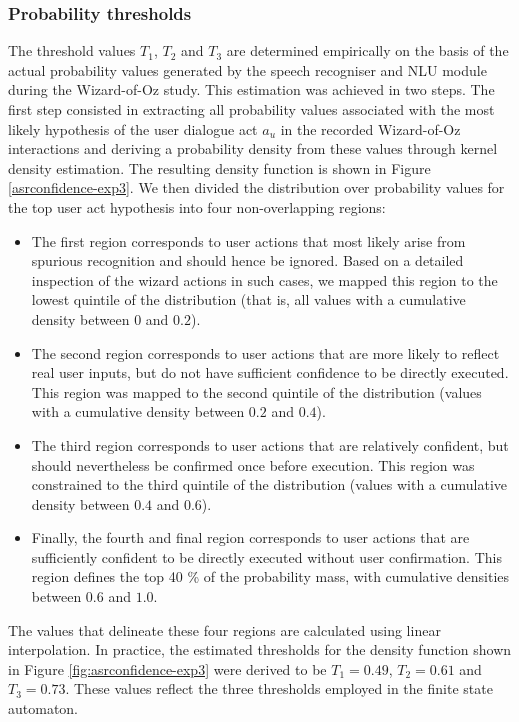 \subsubsection*{Probability thresholds}

The threshold values $T_1$, $T_2$ and $T_3$ are determined empirically on the basis of the actual probability values generated by the speech recogniser and NLU module during the Wizard-of-Oz study.  This estimation was achieved in two steps.  The first step consisted in  extracting all probability values associated with the most likely hypothesis of the user dialogue act $a_u$ in the recorded Wizard-of-Oz interactions and deriving a probability density from these values through kernel density estimation. The resulting density function is shown in Figure \ref{asrconfidence-exp3}. We then divided the distribution over probability values for the top user act hypothesis into four non-overlapping regions:
\begin{itemize}
\item The first region corresponds to user actions that most likely arise from spurious recognition and should hence be ignored. Based on a detailed inspection of the wizard actions in such cases, we mapped this region to the lowest quintile of the distribution (that is, all values with a cumulative density between $0$ and $0.2$). 
\item The second region corresponds to user actions that are more likely to reflect real user inputs, but do not have sufficient confidence to be directly executed.  This region was mapped to the second quintile of the distribution (values with a cumulative density between $0.2$ and $0.4$).
\item The third region corresponds to user actions that are relatively confident, but should nevertheless be confirmed once before execution.  This region was constrained to the third quintile of the distribution (values with a cumulative density between $0.4$ and $0.6$).
\item Finally, the fourth and final region corresponds to user actions that are sufficiently confident to be directly executed without user confirmation. This region defines the top 40 \% of the probability mass, with cumulative densities between $0.6$ and $1.0$.
\end{itemize}

The values that delineate these four regions are calculated using linear interpolation. In practice, the estimated thresholds for the density function shown in Figure \ref{fig:asrconfidence-exp3} were derived to be $T_1 = 0.49$, $T_2 = 0.61$ and $T_3 = 0.73$. These values reflect the three thresholds employed in the finite state automaton. 


